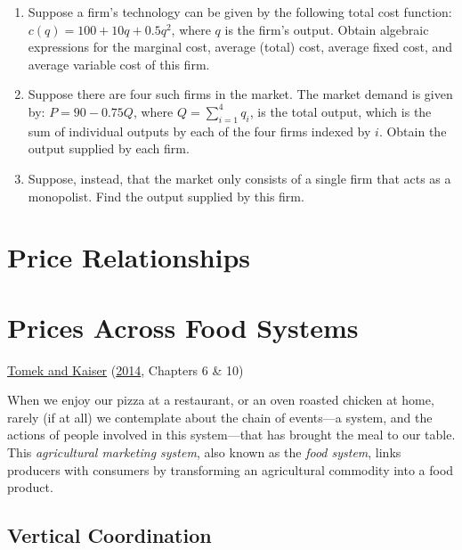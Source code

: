 \documentclass[
  oneside]{book}
\providecommand{\tightlist}{%
  \setlength{\itemsep}{0pt}\setlength{\parskip}{0pt}}
\begin{document}
\begin{enumerate}
\def\labelenumi{\arabic{enumi}.}
\tightlist
\item
  Suppose a firm's technology can be given by the following total cost function: \(c(q) = 100 + 10q +0.5q^2\), where \(q\) is the firm's output. Obtain algebraic expressions for the marginal cost, average (total) cost, average fixed cost, and average variable cost of this firm.
\item
  Suppose there are four such firms in the market. The market demand is given by: \(P = 90 - 0.75Q\), where \(Q = \sum_{i=1}^4 q_i\), is the total output, which is the sum of individual outputs by each of the four firms indexed by \(i\). Obtain the output supplied by each firm.
\item
  Suppose, instead, that the market only consists of a single firm that acts as a monopolist. Find the output supplied by this firm.
\end{enumerate}

\hypertarget{price-relationships}{%
\chapter*{Price Relationships}\label{price-relationships}}

\hypertarget{prices-across-food-systems}{%
\chapter{Prices Across Food Systems}\label{prices-across-food-systems}}

\protect\hyperlink{ref-tomek2014}{Tomek and Kaiser} (\protect\hyperlink{ref-tomek2014}{2014}, Chapters 6 \& 10)

When we enjoy our pizza at a restaurant, or an oven roasted chicken at home, rarely (if at all) we contemplate about the chain of events---a system, and the actions of people involved in this system---that has brought the meal to our table. This \emph{agricultural marketing system}, also known as the \emph{food system}, links producers with consumers by transforming an agricultural commodity into a food product.

\hypertarget{vertical-coordination}{%
\section{Vertical Coordination}\label{vertical-coordination}}
\end{document}
